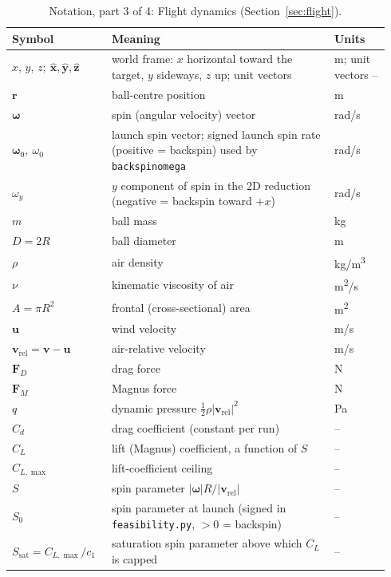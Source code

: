 \documentclass[11pt]{article}
\newcommand{\vect}[1]{\bm{#1}}
\DeclareRobustCommand{\code}[1]{{\def\_{\textunderscore\allowbreak}\texttt{#1}}}
\begin{document}
\begin{table}[p]
\centering
\small
\caption{Notation, part 3 of 4: Flight dynamics (Section~\ref{sec:flight}).}
\label{tab:notation-3}
\begin{tabular}{@{}p{0.24\linewidth}p{0.56\linewidth}p{0.14\linewidth}@{}}
  \toprule
  Symbol & Meaning & Units \\
  \midrule
  $x,\,y,\,z;\ \hat{\vect{x}},\hat{\vect{y}},\hat{\vect{z}}$ & world frame: $x$ horizontal toward the target, $y$ sideways, $z$ up; unit vectors & m; unit vectors -- \\
  $\vect{r}$ & ball-centre position & m \\
  $\vect{\omega}$ & spin (angular velocity) vector & rad/s \\
  $\vect{\omega}_0,\ \omega_0$ & launch spin vector; signed launch spin rate (positive = backspin) used by \code{backspin\_omega} & rad/s \\
  $\omega_y$ & $y$ component of spin in the 2D reduction (negative = backspin toward $+x$) & rad/s \\
  $m$ & ball mass & kg \\
  $D=2R$ & ball diameter & m \\
  $\rho$ & air density & kg/m\textsuperscript{3} \\
  $\nu$ & kinematic viscosity of air & m\textsuperscript{2}/s \\
  $A=\pi R^2$ & frontal (cross-sectional) area & m\textsuperscript{2} \\
  $\vect{u}$ & wind velocity & m/s \\
  $\vect{v}_{\mathrm{rel}}=\vect{v}-\vect{u}$ & air-relative velocity & m/s \\
  $\vect{F}_D$ & drag force & N \\
  $\vect{F}_M$ & Magnus force & N \\
  $q$ & dynamic pressure $\tfrac12\rho|\vect{v}_{\mathrm{rel}}|^2$ & Pa \\
  $C_d$ & drag coefficient (constant per run) & -- \\
  $C_L$ & lift (Magnus) coefficient, a function of $S$ & -- \\
  $C_{L,\max}$ & lift-coefficient ceiling & -- \\
  $S$ & spin parameter $|\vect{\omega}|R/|\vect{v}_{\mathrm{rel}}|$ & -- \\
  $S_0$ & spin parameter at launch (signed in \code{feasibility.py}, $>0$ = backspin) & -- \\
  $S_{\mathrm{sat}}=C_{L,\max}/c_1$ & saturation spin parameter above which $C_L$ is capped & -- \\

\end{tabular}
\end{table}
\end{document}
